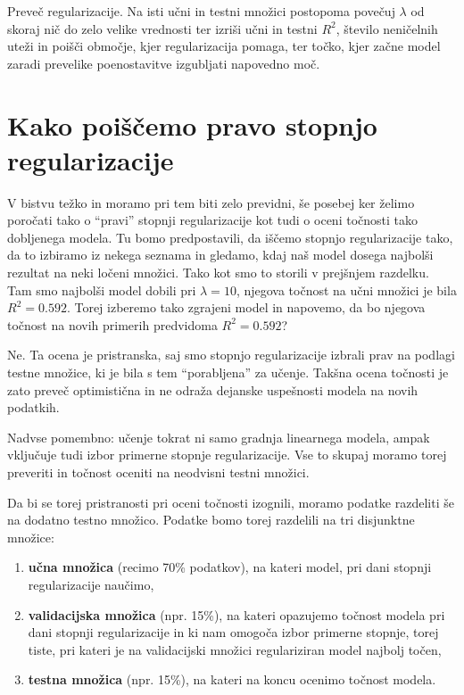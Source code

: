 \begin{exercise}{Preveč regularizacije.}
Na isti učni in testni množici postopoma povečuj $\lambda$ od skoraj nič do zelo velike vrednosti ter izriši učni in testni $R^2$, število neničelnih uteži in poišči območje, kjer regularizacija pomaga, ter točko, kjer začne model zaradi prevelike poenostavitve izgubljati napovedno moč.
\end{exercise}

\section{Kako poiščemo pravo stopnjo regularizacije}

V bistvu težko in moramo pri tem biti zelo previdni, še posebej ker želimo poročati tako o ``pravi'' stopnji regularizacije kot tudi o oceni točnosti tako dobljenega modela. Tu bomo predpostavili, da iščemo stopnjo regularizacije tako, da to izbiramo iz nekega seznama in gledamo, kdaj naš model dosega najbolši rezultat na neki ločeni množici. Tako kot smo to storili v prejšnjem razdelku. Tam smo najbolši model dobili pri $\lambda=10$, njegova točnost na učni množici je bila $R^2=0.592$. Torej izberemo tako zgrajeni model in napovemo, da bo njegova točnost na novih primerih predvidoma $R^2=0.592$?

Ne. Ta ocena je pristranska, saj smo stopnjo regularizacije izbrali prav na podlagi testne množice, ki je bila s tem ``porabljena'' za učenje. Takšna ocena točnosti je zato preveč optimistična in ne odraža dejanske uspešnosti modela na novih podatkih.

Nadvse pomembno: učenje tokrat ni samo gradnja linearnega modela, ampak vključuje tudi izbor primerne stopnje regularizacije. Vse to skupaj moramo torej preveriti in točnost oceniti na neodvisni testni množici.

Da bi se torej pristranosti pri oceni točnosti izognili, moramo podatke razdeliti še na dodatno testno množico. Podatke bomo torej razdelili na tri disjunktne množice:
\begin{enumerate}
    \item \textbf{učna množica} (recimo 70\% podatkov), na kateri model, pri dani stopnji regularizacije naučimo,
    \item \textbf{validacijska množica} (npr. 15\%), na kateri opazujemo točnost modela pri dani stopnji regularizacije in ki nam omogoča izbor primerne stopnje, torej tiste, pri kateri je na validacijski množici regulariziran model najbolj točen,
    \item \textbf{testna množica} (npr. 15\%), na kateri na koncu ocenimo točnost modela.
\end{enumerate}

